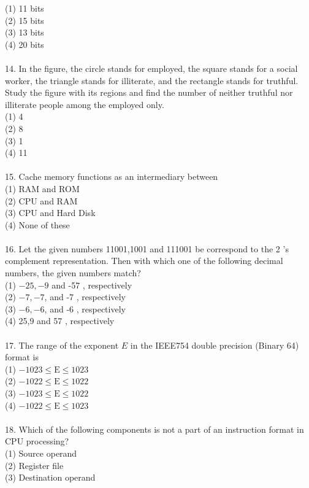 \documentclass[10pt]{article}
\begin{document}
(1) 11 bits\\
(2) 15 bits\\
(3) 13 bits\\
(4) 20 bits\\
\\
14. In the figure, the circle stands for employed, the square stands for a social worker, the triangle stands for illiterate, and the rectangle stands for truthful. Study the figure with its regions and find the number of neither truthful nor illiterate people among the employed only.
\\
(1) 4\\
(2) 8\\
(3) 1\\
(4) 11\\
\\
15. Cache memory functions as an intermediary between\\
(1) RAM and ROM\\
(2) CPU and RAM\\
(3) CPU and Hard Disk\\
(4) None of these\\
\\
16. Let the given numbers 11001,1001 and 111001 be correspond to the 2 's complement representation. Then with which one of the following decimal numbers, the given numbers match?\\
(1) $-25,-9$ and -57 , respectively\\
(2) $-7,-7$, and -7 , respectively\\
(3) $-6,-6$, and -6 , respectively\\
(4) 25,9 and 57 , respectively\\
\\
17. The range of the exponent $E$ in the IEEE754 double precision (Binary 64) format is $\qquad$\\
(1) $-1023 \leq \mathrm{E} \leq 1023$\\
(2) $-1022 \leq \mathrm{E} \leq 1022$\\
(3) $-1023 \leq \mathrm{E} \leq 1022$\\
(4) $-1022 \leq \mathrm{E} \leq 1023$\\
\\
18. Which of the following components is not a part of an instruction format in CPU processing?\\
(1) Source operand\\
(2) Register file\\
(3) Destination operand\\
\end{document}

